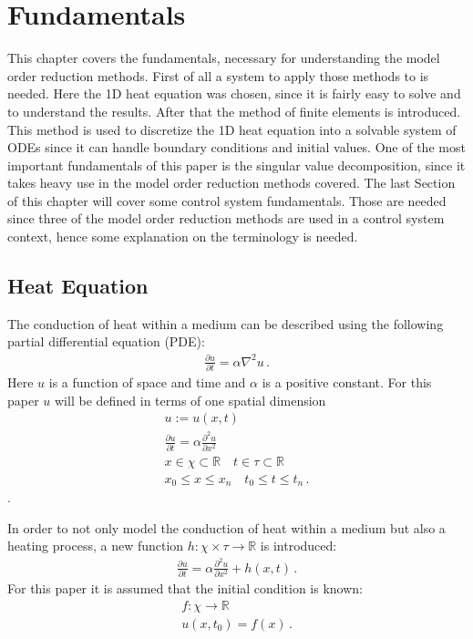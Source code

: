 \chapter{Fundamentals}
This chapter covers the fundamentals, necessary for understanding the model order reduction methods.
First of all a system to apply those methods to is needed.
Here the 1D heat equation was chosen, since it is fairly easy to solve and to understand the results.
After that the method of finite elements is introduced.
This method is used to discretize the 1D heat equation into a solvable system of ODEs since it can handle boundary conditions and initial values.
One of the most important fundamentals of this paper is the singular value decomposition, since it takes heavy use in the model order reduction methods covered.
The last Section of this chapter will cover some control system fundamentals.
Those are needed since three of the model order reduction methods are used in a control system context, hence some explanation on the terminology is needed.
\section{Heat Equation} \label{HE}
The conduction of heat  within a medium can be described using the following partial differential equation (PDE):
\begin{gather}
\frac{\partial u}{\partial t} = \alpha \nabla^{2} u\,. \label{heat}
\end{gather}
Here \(u\) is a function of space and time and \(\alpha\) is a positive constant.
For this paper \(u\) will be defined in terms of one spatial dimension \cite{Gustafsson2011}
\begin{gather}
u := u(x, t) \\
\frac{\partial u}{\partial t} = \alpha \frac{\partial^{2} u}{\partial x^{2}} \\
x \in \chi \subset \mathbb{R} \quad t \in \tau \subset \mathbb{R} \\
x_{0} \leq x \leq x_{n} \quad t_{0} \leq t \leq t_{n}\,.
\end{gather}
.

In order to not only model the conduction of heat within a medium but also a heating process, a new function \(h: \chi \times \tau \rightarrow  \mathbb{R}\) is introduced:
\begin{gather}
\frac{\partial u}{\partial t} = \alpha \frac{\partial^{2} u}{\partial x^{2}} + h(x,t)\,. \label{eq-1d-h}
\end{gather}
For this paper it is assumed that the initial condition is known:
\begin{gather}
f: \chi \rightarrow \mathbb{R} \\
u(x, t_{0}) = f(x)\,.
\end{gather} 

